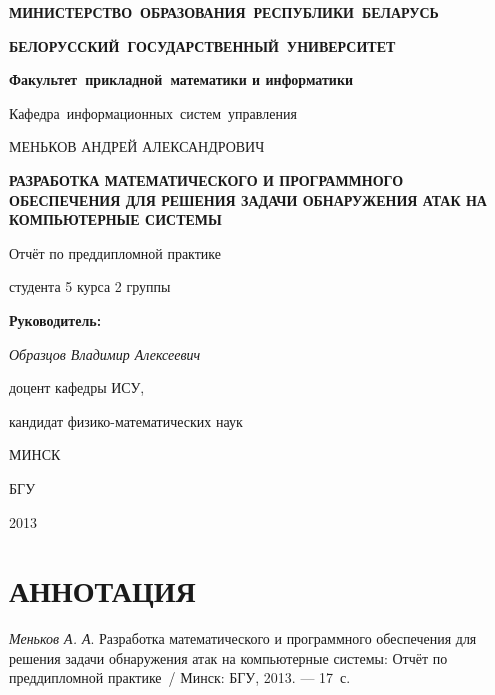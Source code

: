 \titlepage
\begin{center}
	\begin{large}
		\textbf{МИНИСТЕРСТВО~ОБРАЗОВАНИЯ~РЕСПУБЛИКИ~БЕЛАРУСЬ}
		
		\smallskip
		\textbf{БЕЛОРУССКИЙ~ГОСУДАРСТВЕННЫЙ~УНИВЕРСИТЕТ}
		
		\smallskip
		\textbf{Факультет~прикладной~математики и информатики}
		
		\smallskip
		Кафедра~информационных~систем~управления
	\end{large}
\end{center}

\vfill

\begin{center}
	\large {МЕНЬКОВ АНДРЕЙ АЛЕКСАНДРОВИЧ}
	
	\bigskip	
	{\Large \textbf{РАЗРАБОТКА МАТЕМАТИЧЕСКОГО И ПРОГРАММНОГО ОБЕСПЕЧЕНИЯ ДЛЯ РЕШЕНИЯ ЗАДАЧИ ОБНАРУЖЕНИЯ АТАК НА КОМПЬЮТЕРНЫЕ СИСТЕМЫ}}
	
	\bigskip
	Отчёт по преддипломной практике
	
	студента 5 курса 2 группы
\end{center}


\vfill
\begin{flushright}
	\begin{minipage}{7cm}
		\textbf{Руководитель:}
		
		\textit{Образцов Владимир Алексеевич}
		
		доцент кафедры ИСУ,
		
		кандидат физико-математических наук 
	\end{minipage}
\end{flushright}

\vfill

\begin{center}
	МИНСК
	
	БГУ
	
	2013
\end{center}

\newpage

\newcommand{\pagescount}{17}
\section*{АННОТАЦИЯ}

\textit{Меньков А. А}. Разработка математического и программного обеспечения для решения задачи обнаружения атак на компьютерные системы:
Отчёт по преддипломной практике~/ Минск: 
БГУ, 2013. --- \pagescount~с.

